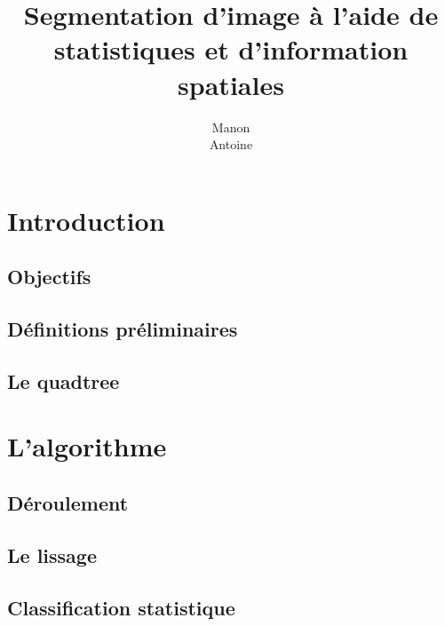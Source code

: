 \documentclass[12pt,titlepage,a4paper]{report}
\title{Segmentation d'image à l'aide de statistiques et d'information spatiales}
\author{Manon \bsc{Ansart}\\Antoine \bsc{Augusti}}
\begin{document}
	\dominitoc
	\tableofcontents

	\chapter{Introduction}
	\minitoc
		\section{Objectifs}
			

		\section{Définitions préliminaires}
			

		\section{Le quadtree}
			
	\chapter{L'algorithme}
		\section{Déroulement}
			
		\section{Le lissage}
			
		\section{Classification statistique}
			

	
	
\end{document}
